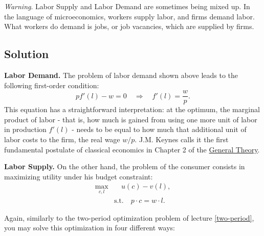 \documentclass[]{book}
\begin{document}
\emph{Warning}. Labor Supply and Labor Demand are sometimes being mixed
up. In the language of microeconomics, workers supply labor, and firms
demand labor. What workers do demand is jobs, or job vacancies, which
are supplied by firms.

\subsection{Solution}\label{solution-2}

\textbf{Labor Demand.} The problem of labor demand shown above leads to
the following first-order condition:
\[pf'(l)-w = 0 \quad \Rightarrow \quad f'(l)=\frac{w}{p}.\] This
equation has a straightforward interpretation: at the optimum, the
marginal product of labor - that is, how much is gained from using one
more unit of labor in production \(f'(l)\) - needs to be equal to how
much that additional unit of labor costs to the firm, the real wage
\(w/p\). J.M. Keynes calls it the first fundamental postulate of
classical economics in Chapter 2 of the
\href{http://cas2.umkc.edu/economics/people/facultypages/kregel/courses/econ645/winter2011/generaltheory.pdf}{General
Theory}.

\textbf{Labor Supply.} On the other hand, the problem of the consumer
consists in maximizing utility under his budget constraint: \[
\begin{aligned}
\max_{c,l}& \quad u(c)-v(l),\\
&\text{s.t.}\quad p \cdot c = w \cdot l.
\end{aligned}
\]

Again, similarly to the two-period optimization problem of lecture
\ref{two-period}, you may solve this optimization in four different
ways:
\end{document}
